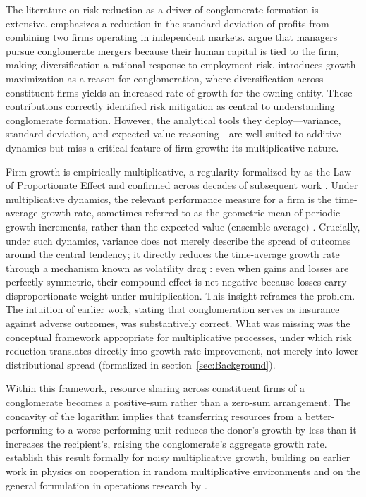 \documentclass[12pt,a4paper]{article}
\begin{document}
The literature on risk reduction as a driver of conglomerate formation is extensive. \textcite{scherer1990industrial} emphasizes a reduction in the standard deviation of profits from combining two firms operating in independent markets. \textcite{amihud1981risk} argue that managers pursue conglomerate mergers because their human capital is tied to the firm, making diversification a rational response to employment risk. \textcite{mueller1969theory} introduces growth maximization as a reason for conglomeration, where diversification across constituent firms yields an increased rate of growth for the owning entity. These contributions correctly identified risk mitigation as central to understanding conglomerate formation. However, the analytical tools they deploy---variance, standard deviation, and expected-value reasoning---are well suited to additive dynamics but miss a critical feature of firm growth: its multiplicative nature. 

Firm growth is empirically multiplicative, a regularity formalized by \textcite{gibrat1931} as the Law of Proportionate Effect and confirmed across decades of subsequent work \parencite{sutton1997gibrat, stanley1996scaling, bottazzi2006explaining, santarelli2006gibrat}. Under multiplicative dynamics, the relevant performance measure for a firm is the time-average growth rate, sometimes referred to as the geometric mean of periodic growth increments, rather than the expected value (ensemble average) \parencite{peters2019ergodicity}. Crucially, under such dynamics, variance does not merely describe the spread of outcomes around the central tendency; it directly reduces the time-average growth rate through a mechanism known as volatility drag \parencite{messmore1995variance, spitznagel2021safe}: even when gains and losses are perfectly symmetric, their compound effect is net negative because losses carry disproportionate weight under multiplication. This insight reframes the problem. The intuition of earlier work, stating that conglomeration serves as insurance against adverse outcomes, was substantively correct. What was missing was the conceptual framework appropriate for multiplicative processes, under which risk reduction translates directly into growth rate improvement, not merely into lower distributional spread (formalized in section~\ref{sec:Background}). 

Within this framework, resource sharing across constituent firms of a  conglomerate becomes a positive-sum rather than a zero-sum arrangement. The concavity of the logarithm implies that transferring resources from a better-performing to a worse-performing unit reduces the donor's growth by less than it increases the recipient's, raising the conglomerate's aggregate growth rate. \textcite{peters2022ergodicity} establish this result formally for noisy multiplicative growth, building on earlier work in physics on cooperation in random multiplicative environments \parencite{yaari2010cooperation} and on the general formulation in operations research by \textcite{liebmann2017sharing}.
\end{document}
